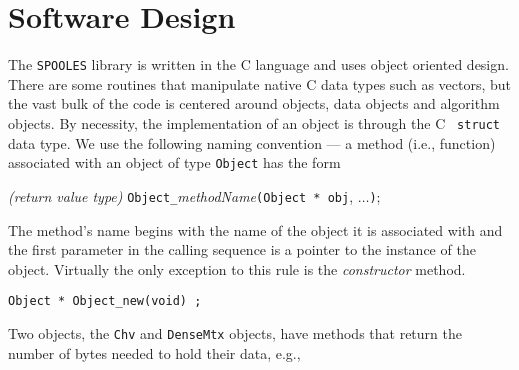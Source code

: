 \par
\section{Software Design}
\label{chapter:softwareDesign}
\par
The {\tt SPOOLES} library is written in the C language and uses
object oriented design.
There are some routines that manipulate native C data types such as
vectors, but the vast bulk of the code is centered around objects,
data objects and algorithm objects.
By necessity, the implementation of an object is through the C {\tt
struct} data type.
We use the following naming convention --- a method (i.e., function)
associated with an object of type {\tt Object} has the form

\centerline{{\it (return value type)}
{\tt Object\_}{\it methodName}{\tt (Object * obj}, $\ldots${\tt )};}

The method's name begins with the name of the object it is
associated with and the first parameter in the calling sequence is
a pointer to the instance of the object. 
Virtually the only exception to this rule is the {\it constructor} 
method.

\centerline{\tt Object * Object\_new(void) ;}

Two objects, the {\tt Chv} and {\tt DenseMtx} objects, have
methods that return the number of bytes needed to hold their data,
e.g.,

